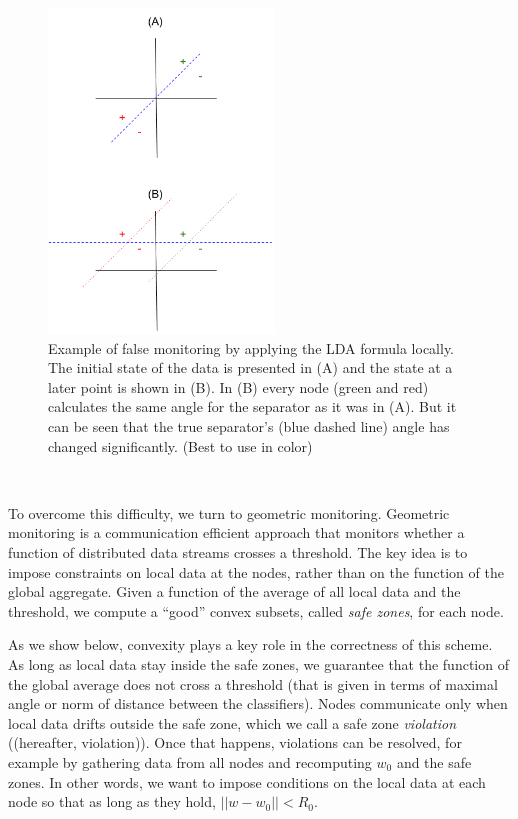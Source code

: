 \documentclass{sig-alternate-05-2015}
\begin{document}
\begin{figure}[h]
\centering
\includegraphics[width=60mm]{NegativeExample.png}
\caption{Example of false monitoring by applying the LDA formula locally. The
initial state of the data is presented in (A) and the state at a later point
is shown in (B). In (B) every node (green and red) calculates the same angle
for the separator as it was in (A). But it can be
seen that the true separator's (blue dashed line) angle has changed
significantly. (Best to use in color)}
\label{NegativeExampl}
\end{figure}


\\\par To overcome this difficulty, we turn to geometric monitoring. Geometric
monitoring \cite{keren2014geometric, keren2012shape} is a communication
efficient approach that monitors whether a function of distributed
data streams crosses a threshold. The key idea is to
impose constraints on local data at the nodes, rather than
on the function of the global aggregate. Given a function of
the average of all local data and the threshold, we compute a
``good'' convex subsets, called \textit{safe zones}, for each
node.
\\\par As we show below, convexity
plays a key role in the correctness of this scheme. As long
as local data stay inside the safe zones, we guarantee that
the function of the global average does not cross a threshold (that is given
in terms of maximal angle or norm of distance between the classifiers).
Nodes communicate only when local data drifts outside the
safe zone, which we call a safe zone \textit{violation} ((hereafter,
violation)). Once that happens, violations can be resolved, for example by gathering
data from all nodes and recomputing $w_0$ and the safe zones.
In other words, we want to impose conditions on the local
data at each node so that as long as they hold, $||w-w_0||<R_0$.
\end{document}

